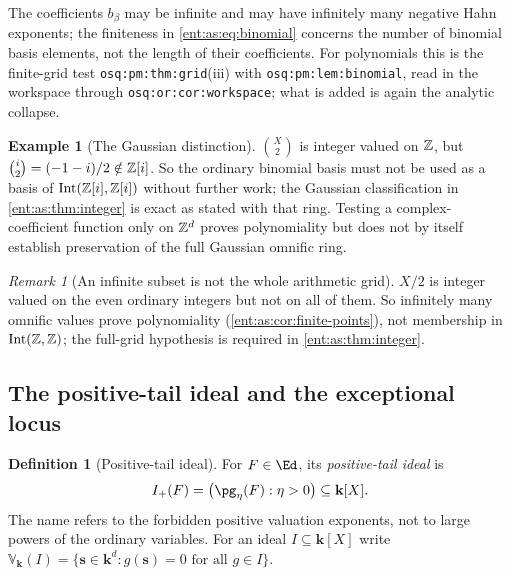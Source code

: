 \documentclass[11pt]{article}
\theoremstyle{plain}
\theoremstyle{plain}
\theoremstyle{plain}
\theoremstyle{definition}
\newtheorem{definition}[definition]{Definition}
\theoremstyle{definition}
\theoremstyle{definition}
\newtheorem{example}[example]{Example}
\theoremstyle{definition}
\theoremstyle{remark}
\newtheorem{remark}[remark]{Remark}
\newcommand{\kk}{\mathbf k}\newcommand{\PP}{\mathbb P}
\DeclareMathOperator{\Int}{Int}\DeclareMathOperator{\ct}{ct}
\begin{document}
The coefficients $b_\beta$ may be infinite and may have infinitely many
negative Hahn exponents; the finiteness in \eqref{ent:as:eq:binomial} concerns
the number of binomial basis elements, not the length of their coefficients.
For polynomials this is the finite-grid test \texttt{osq:pm:thm:grid}(iii) with
\texttt{osq:pm:lem:binomial}, read in the workspace through
\texttt{osq:or:cor:workspace}; what is added is again the analytic collapse.

\begin{example}[The Gaussian distinction]\label{ent:as:ex:gaussian}
$\binom X2$ is integer valued on $\mathbb Z$, but $\binom i2=(-1-i)/2\notin\mathbb Z[i]$. So
the ordinary binomial basis must not be used as a basis of
$\Int(\Z[i],\Z[i])$ without further work; the Gaussian classification in
\cref{ent:as:thm:integer} is exact as stated with that ring. Testing a
complex-coefficient function only on $\mathbb Z^d$ proves polynomiality but does not
by itself establish preservation of the full Gaussian omnific ring.
\end{example}

\begin{remark}[An infinite subset is not the whole arithmetic grid]
\label{ent:as:rem:subset}
$X/2$ is integer valued on the even ordinary integers but not on all of them.
So infinitely many omnific values prove polynomiality
(\cref{ent:as:cor:finite-points}), not membership in $\Int(\Z,\Z)$; the
full-grid hypothesis is required in \cref{ent:as:thm:integer}.
\end{remark}

\subsection{The positive-tail ideal and the exceptional locus}
\label{ent:as:subsec:tail}

\begin{definition}[Positive-tail ideal]\label{ent:as:def:tail}
For $F\in\Ed$, its \emph{positive-tail ideal} is
\begin{equation}\label{ent:as:eq:tail-ideal}
 I_+(F)=\bigl(\pg_\eta(F):\eta>0\bigr)\subseteq\kk[X].
\end{equation}
The name refers to the forbidden positive valuation exponents, not to large
powers of the ordinary variables. For an ideal $I\subseteq\kk[X]$ write
$\mathbb V_\kk(I)=\{\mathbf s\in\kk^d:g(\mathbf s)=0\text{ for all }g\in I\}$.
\end{definition}
\end{document}
